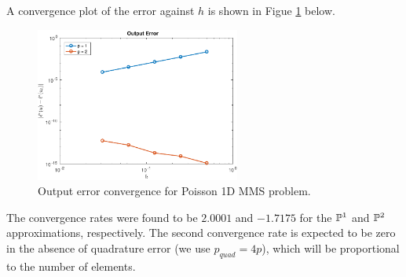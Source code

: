 \documentclass{article}
\begin{document}
\begin{itemize}
	A convergence plot of the error against \(h\) is shown in Figue \ref{fig:mms_out} below.
	\begin{figure}[H]
		\centering
		\includegraphics[width=0.6\textwidth]{MMS_output_conv.pdf}
		\caption{Output error convergence for Poisson 1D MMS problem.}
		\label{fig:mms_out}
	\end{figure}
	The convergence rates were found to be \(2.0001\) and \(-1.7175\) for the \(\mathbb{P}^1 \) and \(\mathbb{P}^2 \) approximations, respectively. The second convergence rate is expected to be zero in the absence of quadrature error (we use \(p_{quad} = 4p\)), which will be proportional to the number of elements. 
\end{itemize}
\end{document}
